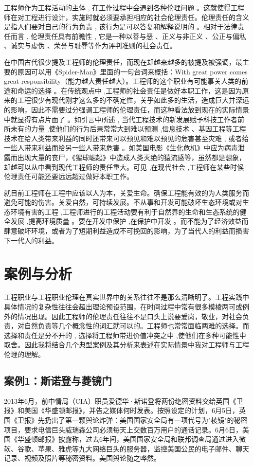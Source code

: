 \documentclass[a4paper,12pt]{ctexart}
\begin{document}
工程师作为工程活动的主体 , 在工作过程中会遇到各种伦理问题 。这就使得工程师在对工程进行设计，实施时就必须要承担相应的社会伦理责任。伦理责任的含义是指人们要对自己的行为负责 , 该行为是可以答复和解释说明的 。相对于法律责任而言 , 伦理责任具有前瞻性 , 它是一种以善与恶 、正义与非正义 、公正与偏私 、诚实与虚伪 、荣誉与耻辱等作为评判准则的社会责任。

在中国古代很少提及工程师的伦理责任，而现在却越来越多的被提及被强调，最主要的原因可以用《Spider-Man》里面的一句台词来概括：With great power comes great responsibility（能力越大责任越大）。工程师的这个职业有可能事关人类的前途和命运的选择 。在传统观点中 ,工程师的社会责任是做好本职工作，这是因为原来的工程很少有现代刚才这么多的不确定性，关乎如此多的生活，造成巨大并深远的影响，因此不需要过分强调工程师的伦理责任，而这种看法放到现在的实际情景中就显得有点片面了 。如引言中所述 , 当代工程技术的新发展赋予科技工作者前所未有的力量 ,使他们的行为后果常常大到难以预测 ,信息技术 、基因工程等工程技术在给人类带来利益的同时还带来可以预见和难以预见的危害甚至灾难 , 或者给一些人带来利益而给另一些人带来危害 。如美国电影《生化危机》中应为病毒泄露而出现大量的丧尸，《猩球崛起》中造成人类灭绝的猿流感等，虽然都是想象，却越可以从中看到现代工程师的责任重大。可见 ,在现代社会 ,工程师在某些时候伦理责任可能还要远远超过做好本职工作。

就目前工程师在工程中应该以人为本，关爱生命。确保工程能有效的为人类服务而避免可能的伤害。关爱自然，可持续发展。不从事和开发可能破坏生态环境或对生态环境有害的工程 ,工程师进行的工程活动要有利于自然界的生命和生态系统的健全发展 ,提高环境质量 。要在开发中保护 ,在保护中开发 。而不能为了经济效益而肆意破坏环境，或者为了短期利益造成不可挽回的影响，为了当代人的利益而损害下一代人的利益。

\section{案例与分析}
工程职业与工程职业伦理在真实世界中的关系往往不是那么清晰明了。工程实践中具体情况的复杂性往往会超出理论预设范围，在时间过程中常有很多模棱两可或例外的情况出现。因此工程师的伦理责任往往不是口头上说要爱岗，敬业，对社会负责，对自然负责等几个概念性的词汇就可以的。工程师也常常面临两难的选择。而选择和责任是分不开的 , 选择将工程师带进价值冲突之中 ,使他们在多种可能性中取舍。因此我将结合几个典型案例及其分析来表述在实际情景中我对工程师与工程伦理的理解。
\subsection{案例1：斯诺登与菱镜门}
2013年6月，前中情局（CIA）职员爱德华·斯诺登将两份绝密资料交给英国《卫报》和美国《华盛顿邮报》，并告之媒体何时发表。按照设定的计划，6月5日，英国《卫报》先扔出了第一颗舆论炸弹：美国国家安全局有一项代号为"棱镜"的秘密项目，要求电信巨头威瑞森公司必须每天上交数百万用户的通话记录。6月6日，美国《华盛顿邮报》披露称，过去6年间，美国国家安全局和联邦调查局通过进入微软、谷歌、苹果、雅虎等九大网络巨头的服务器，监控美国公民的电子邮件、聊天记录、视频及照片等秘密资料。美国舆论随之哗然。
\end{document}
